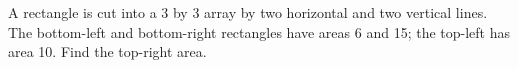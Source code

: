 A rectangle is cut into a 3 by 3 array by two horizontal and two vertical lines. The bottom-left and bottom-right rectangles have areas 6 and 15; the top-left has area 10. Find the top-right area.
